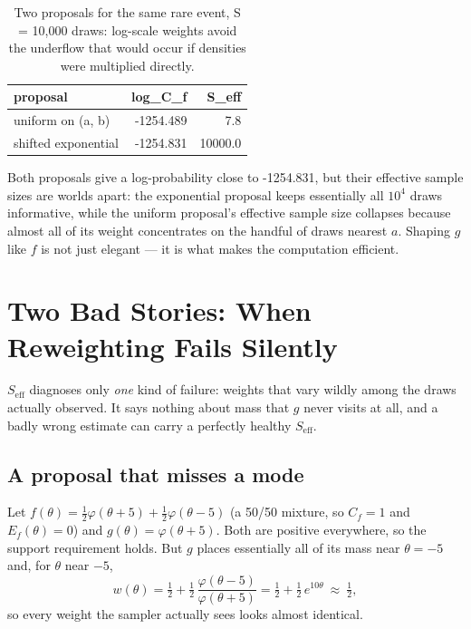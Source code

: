 \documentclass[
  letterpaper,
  DIV=11,
  numbers=noendperiod]{scrreprt}
\begin{document}
{

\begin{longtable}[]{@{}lrr@{}}

\caption{\label{tbl-tail-proposals}Two proposals for the same rare
event, S = 10,000 draws: log-scale weights avoid the underflow that
would occur if densities were multiplied directly.}

\tabularnewline

\toprule\noalign{}
proposal & log\_C\_f & S\_eff \\
\midrule\noalign{}
\endhead
\bottomrule\noalign{}
\endlastfoot
uniform on (a, b) & -1254.489 & 7.8 \\
shifted exponential & -1254.831 & 10000.0 \\

\end{longtable}

}

Both proposals give a log-probability close to -1254.831, but their
effective sample sizes are worlds apart: the exponential proposal keeps
essentially all \ensuremath{10^{4}} draws informative, while the uniform
proposal's effective sample size collapses because almost all of its
weight concentrates on the handful of draws nearest \(a\). Shaping \(g\)
like \(f\) is not just elegant --- it is what makes the computation
efficient.

\section{Two Bad Stories: When Reweighting Fails
Silently}\label{two-bad-stories-when-reweighting-fails-silently}

\(S_{\text{eff}}\) diagnoses only \emph{one} kind of failure: weights
that vary wildly among the draws actually observed. It says nothing
about mass that \(g\) never visits at all, and a badly wrong estimate
can carry a perfectly healthy \(S_{\text{eff}}\).

\subsection{A proposal that misses a
mode}\label{a-proposal-that-misses-a-mode}

Let
\(f(\theta) = \tfrac12\varphi(\theta+5) + \tfrac12\varphi(\theta-5)\) (a
50/50 mixture, so \(C_f=1\) and \(E_f(\theta)=0\)) and
\(g(\theta) = \varphi(\theta+5)\). Both are positive everywhere, so the
support requirement holds. But \(g\) places essentially all of its mass
near \(\theta=-5\) and, for \(\theta\) near \(-5\), \[
w(\theta) = \tfrac12 + \tfrac12\,\frac{\varphi(\theta-5)}{\varphi(\theta+5)}
= \tfrac12 + \tfrac12\, e^{10\theta} \ \approx\ \tfrac12,
\] so every weight the sampler actually sees looks almost identical.
\end{document}
